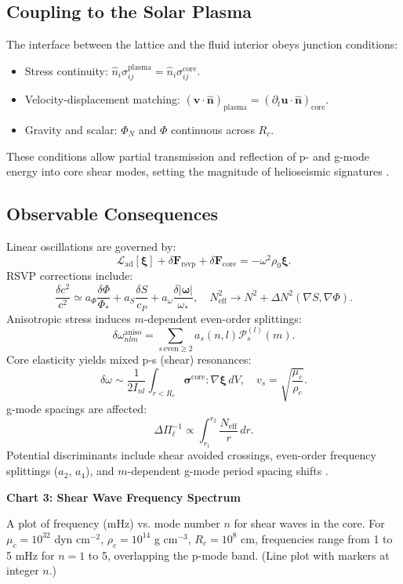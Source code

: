 \documentclass{article}
\begin{document}
\subsection{Coupling to the Solar Plasma}

The interface between the lattice and the fluid interior obeys junction conditions:
\begin{itemize}
\item Stress continuity: $\hat{n}_i \sigma^{\text{plasma}}_{ij} = \hat{n}_i \sigma^{\text{core}}_{ij}$.
\item Velocity-displacement matching: $(\mathbf{v} \cdot \hat{\mathbf{n}})_{\text{plasma}} = (\partial_t \mathbf{u} \cdot \hat{\mathbf{n}})_{\text{core}}$.
\item Gravity and scalar: $\Phi_N$ and $\Phi$ continuous across $R_c$.
\end{itemize}
These conditions allow partial transmission and reflection of p- and g-mode energy into core shear modes, setting the magnitude of helioseismic signatures \citep{aerts2010}.

\subsection{Observable Consequences}

Linear oscillations are governed by:
\[
\mathcal{L}_{\text{ad}}[\boldsymbol{\xi}] + \delta \mathbf{F}_{\text{rsvp}} + \delta \mathbf{F}_{\text{core}} = -\omega^2 \rho_0 \boldsymbol{\xi}.
\]
RSVP corrections include:
\[
\frac{\delta c^2}{c^2} \simeq a_\Phi \frac{\delta \Phi}{\Phi_*} + a_S \frac{\delta S}{c_P} + a_\omega \frac{\delta |\boldsymbol{\omega}|}{\omega_*}, \quad N_{\text{eff}}^2 \to N^2 + \Delta N^2 (\nabla S, \nabla \Phi).
\]
Anisotropic stress induces $m$-dependent even-order splittings:
\[
\delta \omega_{nlm}^{\text{aniso}} = \sum_{s \, \text{even} \ge 2} a_s(n,l) \mathcal{P}_s^{(l)}(m).
\]
Core elasticity yields mixed p-s (shear) resonances:
\[
\delta \omega \sim \frac{1}{2 I_{nl}} \int_{r<R_c} \boldsymbol{\sigma}^{\text{core}} : \nabla \boldsymbol{\xi} \, dV, \quad v_s = \sqrt{\frac{\mu_c}{\rho_c}}.
\]
g-mode spacings are affected:
\[
\Delta \Pi_{\ell}^{-1} \propto \int_{r_1}^{r_2} \frac{N_{\text{eff}}}{r} \, dr.
\]
Potential discriminants include shear avoided crossings, even-order frequency splittings ($a_2$, $a_4$), and $m$-dependent g-mode period spacing shifts \citep{lund2017}.

\textbf{Chart 3: Shear Wave Frequency Spectrum}

A plot of frequency (mHz) vs. mode number $n$ for shear waves in the core. For $\mu_c = 10^{32}$ dyn cm$^{-2}$, $\rho_c = 10^{14}$ g cm$^{-3}$, $R_c = 10^8$ cm, frequencies range from 1 to 5 mHz for $n=1$ to 5, overlapping the p-mode band. (Line plot with markers at integer $n$.)
\end{document}
